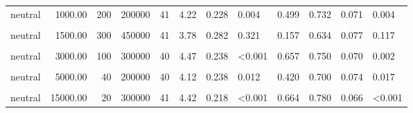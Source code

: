\documentclass[
]{article}
\begin{document}
\begin{longtable}[t]{lrrrrrrlrrrl}
\hspace{1em}neutral & 1000.00 & 200 & 200000 & 41 & 4.22 & 0.228 & 0.004 & 0.499 & 0.732 & 0.071 & 0.004\\
\hspace{1em}\cellcolor{gray!10}{neutral} & \cellcolor{gray!10}{1500.00} & \cellcolor{gray!10}{50} & \cellcolor{gray!10}{75000} & \cellcolor{gray!10}{40} & \cellcolor{gray!10}{4.17} & \cellcolor{gray!10}{0.229} & \cellcolor{gray!10}{0.006} & \cellcolor{gray!10}{0.472} & \cellcolor{gray!10}{0.725} & \cellcolor{gray!10}{0.072} & \cellcolor{gray!10}{0.006}\\
\hspace{1em}neutral & 1500.00 & 300 & 450000 & 41 & 3.78 & 0.282 & 0.321 & 0.157 & 0.634 & 0.077 & 0.117\\
\hspace{1em}\cellcolor{gray!10}{neutral} & \cellcolor{gray!10}{3000.00} & \cellcolor{gray!10}{10} & \cellcolor{gray!10}{30000} & \cellcolor{gray!10}{41} & \cellcolor{gray!10}{4.42} & \cellcolor{gray!10}{0.218} & \cellcolor{gray!10}{<0.001} & \cellcolor{gray!10}{0.664} & \cellcolor{gray!10}{0.780} & \cellcolor{gray!10}{0.066} & \cellcolor{gray!10}{<0.001}\\
\hspace{1em}neutral & 3000.00 & 100 & 300000 & 40 & 4.47 & 0.238 & <0.001 & 0.657 & 0.750 & 0.070 & 0.002\\
\hspace{1em}\cellcolor{gray!10}{neutral} & \cellcolor{gray!10}{5000.00} & \cellcolor{gray!10}{30} & \cellcolor{gray!10}{150000} & \cellcolor{gray!10}{41} & \cellcolor{gray!10}{4.20} & \cellcolor{gray!10}{0.255} & \cellcolor{gray!10}{0.012} & \cellcolor{gray!10}{0.430} & \cellcolor{gray!10}{0.780} & \cellcolor{gray!10}{0.066} & \cellcolor{gray!10}{<0.001}\\
\hspace{1em}neutral & 5000.00 & 40 & 200000 & 40 & 4.12 & 0.238 & 0.012 & 0.420 & 0.700 & 0.074 & 0.017\\
\hspace{1em}\cellcolor{gray!10}{neutral} & \cellcolor{gray!10}{10000.00} & \cellcolor{gray!10}{10} & \cellcolor{gray!10}{100000} & \cellcolor{gray!10}{81} & \cellcolor{gray!10}{4.47} & \cellcolor{gray!10}{0.156} & \cellcolor{gray!10}{<0.001} & \cellcolor{gray!10}{0.694} & \cellcolor{gray!10}{0.778} & \cellcolor{gray!10}{0.047} & \cellcolor{gray!10}{<0.001}\\
\hspace{1em}neutral & 15000.00 & 20 & 300000 & 41 & 4.42 & 0.218 & <0.001 & 0.664 & 0.780 & 0.066 & <0.001\\

\end{longtable}
\end{document}

